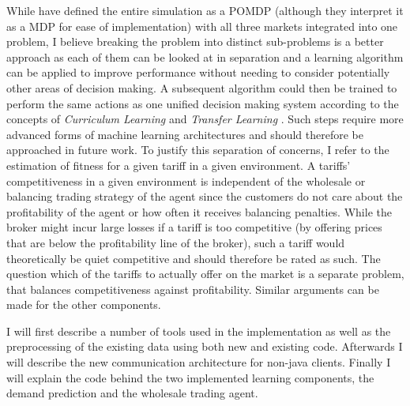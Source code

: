 While \citep{tactexurieli2016mdp} have defined the entire simulation as a \ac{POMDP} (although they interpret it as a
\ac{MDP} for ease of implementation) with all three markets integrated into one problem, I believe breaking the problem
into distinct sub-problems is a better approach as each of them can be looked at in separation and a learning algorithm
can be applied to improve performance without needing to consider potentially other areas of decision making. A
subsequent algorithm could then be trained to perform the same actions as one unified decision making system according
to the concepts of \emph{Curriculum Learning}\citep{matiisen2017teacher} and \emph{Transfer Learning}
\citep{parisotto2015actor}. Such steps require more advanced forms of machine learning architectures and should
therefore be approached in future work.
To justify this separation of concerns, I refer to the estimation of fitness for a given tariff in a given environment.
A tariffs' competitiveness in a given environment is independent of the wholesale or balancing trading strategy of the
agent since the customers do not care about the profitability of the agent or how often it receives balancing penalties.
While the broker might incur large losses if a tariff is too competitive (by offering prices that are below the
profitability line of the broker), such a tariff would theoretically be quiet competitive and should therefore be rated
as such. The question which of the tariffs to actually offer on the market is a separate problem, that balances
competitiveness against profitability. Similar arguments can be made for the other components.

I will first describe a number of tools used in the implementation as well as the preprocessing of the existing data
using both new and existing code. Afterwards I will describe the new communication architecture for non-java clients.
Finally I will explain the code behind the two implemented learning components, the demand prediction and the wholesale
trading agent.


